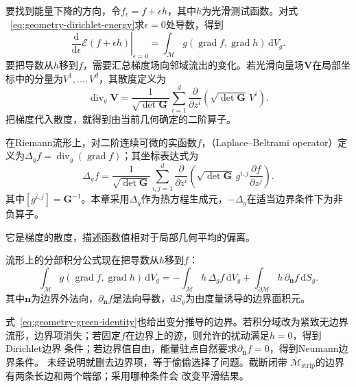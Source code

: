 要找到能量下降的方向，令$f_{\epsilon}=f+\epsilon h$，其中$h$为光滑测试函数。对式
~\eqref{eq:geometry-dirichlet-energy}求$\epsilon=0$处导数，得到
\begin{equation}
  \left.
  \frac{\mathrm{d}}{\mathrm{d}\epsilon}
  \mathcal{E}(f+\epsilon h)
  \right|_{\epsilon=0}
  =
  \int_{\mathcal{M}}
  g(\operatorname{grad}f,\operatorname{grad}h)
  \,\mathrm{d}V_g.
  \label{eq:geometry-dirichlet-first-variation}
\end{equation}
要把导数从$h$移到$f$，需要汇总梯度场向邻域流出的变化。若光滑向量场$\bm{V}$在局部坐标中的分量为$V^1,\ldots,V^d$，其散度定义为
\[
  \operatorname{div}_g\bm{V}
  =
  \frac{1}{\sqrt{\det\bm{G}}}
  \sum_{i=1}^{d}
  \frac{\partial}{\partial z^i}
  \left(\sqrt{\det\bm{G}}\,V^i\right).
\]
把梯度代入散度，就得到由当前几何确定的二阶算子。
\begin{definition}
\label{def:geometry-laplace-beltrami}
在Riemann流形上，对二阶连续可微的实函数$f$，（Laplace--Beltrami operator）定义为$\Delta_gf=\operatorname{div}_g(\operatorname{grad}f)$；其坐标表达式为
\begin{equation}
  \Delta_g f
  =
  \frac{1}{\sqrt{\det\bm{G}}}
  \sum_{i,j=1}^{d}
  \frac{\partial}{\partial z^i}
  \left(
    \sqrt{\det\bm{G}}\,
    g^{i,j}
    \frac{\partial f}{\partial z^j}
  \right).
  \label{eq:geometry-laplace-beltrami}
\end{equation}
其中$[g^{i,j}]=\bm G^{-1}$。本章采用$\Delta_g$作为热方程生成元，$-\Delta_g$在适当边界条件下为非负算子。
\end{definition}
它是梯度的散度，描述函数值相对于局部几何平均的偏离。

流形上的分部积分公式现在把导数从$h$移到$f$：
\begin{equation}
  \int_{\mathcal{M}}
  g(\operatorname{grad}f,\operatorname{grad}h)
  \,\mathrm{d}V_g
  =
  -\int_{\mathcal{M}}
  h\,\Delta_g f\,\mathrm{d}V_g
  +
  \int_{\partial\mathcal{M}}
  h\,\partial_{\bm{n}}f\,\mathrm{d}S_g.
  \label{eq:geometry-green-identity}
\end{equation}
其中$\bm{n}$为边界外法向，$\partial_{\bm{n}}f$是法向导数，$\mathrm dS_g$为由度量诱导的边界面积元。

式~\eqref{eq:geometry-green-identity}也给出变分推导的边界。若积分域改为紧致无边界
流形，边界项消失；若固定$f$在边界上的迹，则允许的扰动满足$h=0$，得到Dirichlet边界
条件；若边界值自由，能量驻点自然要求$\partial_{\bm{n}}f=0$，得到Neumann边界条件。
未经说明就删去边界项，等于偷偷选择了问题。截断闭带
$\overline{\mathcal{M}}_{\mathrm{strip}}$的边界有两条长边和两个端部；采用哪种条件会
改变平滑结果。

